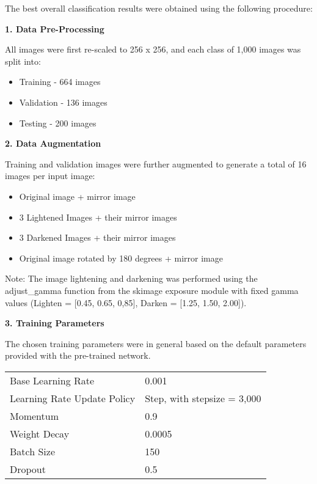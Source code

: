 \documentclass[10pt,a4paper]{article}
\begin{document}
\begin{figure}[h]
\end{figure}


The best overall classification results were obtained using the following procedure:

\textbf{1. Data Pre-Processing}

All images were first re-scaled to 256 x 256, and each class of 1,000 images was split into:
\begin{itemize}
\item Training - 664 images
\item Validation - 136 images
\item Testing - 200 images
\end{itemize}

\textbf{2. Data Augmentation}

Training and validation images were further augmented to generate a total of 16 images per input image:

\begin{itemize}
\item Original image + mirror image
\item 3 Lightened Images + their mirror images
\item 3 Darkened Images + their mirror images
\item Original image rotated by 180 degrees + mirror image
\end{itemize}

Note: The image lightening and darkening was performed using the adjust\_gamma function from the skimage exposure module with fixed gamma values (Lighten = [0.45, 0.65, 0,85], Darken = [1.25, 1.50, 2.00]).


\textbf{3. Training Parameters}

The chosen training parameters were in general based on the default parameters provided with the pre-trained network.

\begin{tabular}{p{5cm} l}
Base Learning Rate & 0.001 \\
Learning Rate Update Policy & Step, with stepsize = 3,000 \\
Momentum & 0.9 \\
Weight Decay & 0.0005 \\
Batch Size & 150 \\
Dropout & 0.5 \\
\end{tabular}
\end{document}
